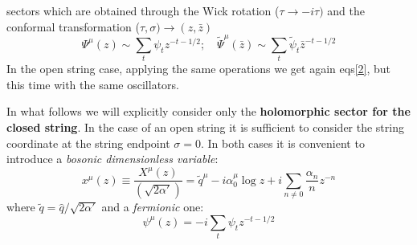 sectors which are obtained through the Wick
rotation  (\(\tau \rightarrow -i\tau)\) and the conformal transformation  (\(\tau,\sigma)\rightarrow\left(z,\bar{z}\right)\)
\begin{equation}
	\Psi^\mu\left(z\right) \sim \sum_t{\psi_tz^{-t-1/2}};\quad \tilde{\Psi}^\mu\left(\bar{z}\right) \sim \sum_t{\tilde{\psi}_t\bar{z}^{-t-1/2}}
\label{2}
\end{equation}
In the open string case, applying the same operations we get again eqs\eqref{2}, but this time with the same oscillators.
\par
In what follows we will explicitly consider only the \textbf{holomorphic sector for the closed string}. In the case of an open string it is sufficient to consider the string
coordinate at the string endpoint $\sigma = 0$. In both cases it is convenient to introduce a \textit{bosonic dimensionless variable}:
\begin{equation}
	x^\mu\left(z\right)\equiv \frac{X^\mu\left(z\right)}{\left(\sqrt{2\alpha'}\right)} = \tilde{q}^\mu -i\alpha_0^\mu\log z + i\sum_{n \neq 0}{\frac{\alpha_n}{n}z^{-n}}
\end{equation}
where $\tilde{q} = \hat{q}/\sqrt{2\alpha'}$ and a \textit{fermionic} one:
\begin{equation}
	\psi^\mu\left(z\right) = -i\sum_t{\psi_tz^{-t-1/2}}
\end{equation}
